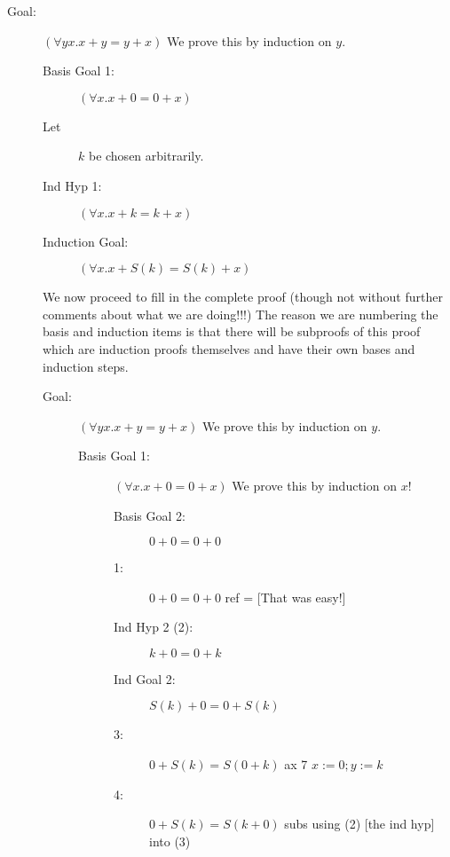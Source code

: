 \documentclass[12pt]{book}
\begin{document}
\begin{description}

\item[Goal:]  $(\forall yx.x+y=y+x)$  We prove this by induction on $y$.

\begin{description}

\item[Basis Goal 1:]  $(\forall x.x+0=0+x)$

\item[Let] $k$ be chosen arbitrarily.

\item[Ind Hyp 1:]  $(\forall x.x+k=k+x)$ 

\item[Induction Goal:]  $(\forall x.x+S(k)=S(k)+x)$


\end{description}

We now proceed to fill in the complete proof (though not without further comments about what we are doing!!!)
The reason we are numbering the basis and induction items is that there will be subproofs of this proof which are
induction proofs themselves and have their own bases and induction steps.

\newpage

\begin{description}

\item[Goal:]  $(\forall yx.x+y=y+x)$  We prove this by induction on $y$.

\begin{description}

\item[Basis Goal 1:]  $(\forall x.x+0=0+x)$  We prove this by induction on $x$!

\begin{description}

\item[Basis Goal 2:]  $0+0=0+0$

\item[1:]  $0+0=0+0$  ref =  [That was easy!]

\item[Ind Hyp 2 (2):]   $k+0=0+k$

\item[Ind Goal 2:]  $S(k)+0=0+S(k)$

\item[3:]  $0+S(k)=S(0+k)$  ax 7 $x:=0; y:=k$

\item[4:]  $0+S(k)=S(k+0)$  subs using (2) [the ind hyp] into (3)


\end{description}
\end{description}
\end{description}
\end{description}
\end{document}
